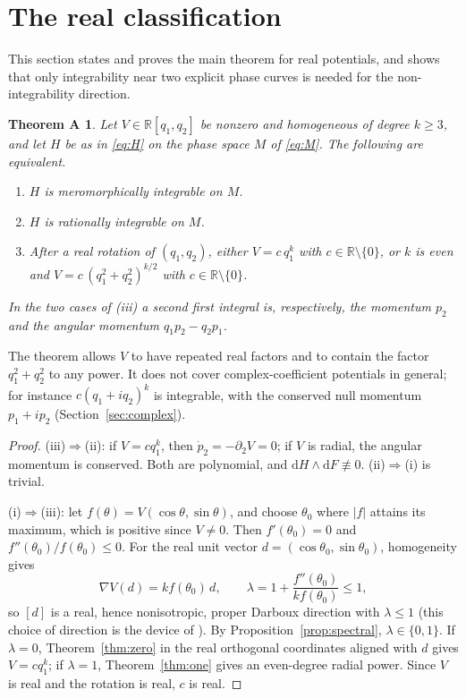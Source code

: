\documentclass[11pt]{article}
\numberwithin{equation}{section}
\newtheorem*{theoremA}{Theorem A}
\theoremstyle{definition}
\theoremstyle{remark}
\newcommand{\R}{\mathbb R}
\newcommand{\dd}{\mathrm d}
\begin{document}
\section{The real classification}\label{sec:proofA}

This section states and proves the main theorem for real potentials, and shows that only integrability near two
explicit phase curves is needed for the non-integrability direction.

\begin{theoremA}
Let $V\in\R[q_1,q_2]$ be nonzero and homogeneous of degree $k\ge3$, and let $H$ be as in \eqref{eq:H} on the
phase space $M$ of \eqref{eq:M}. The following are equivalent.
\begin{enumerate}[label=(\roman*)]
\item $H$ is meromorphically integrable on $M$.
\item $H$ is rationally integrable on $M$.
\item After a real rotation of $(q_1,q_2)$, either $V=c\,q_1^k$ with $c\in\R\setminus\{0\}$, or $k$ is even and
$V=c\,(q_1^2+q_2^2)^{k/2}$ with $c\in\R\setminus\{0\}$.
\end{enumerate}
In the two cases of (iii) a second first integral is, respectively, the momentum $p_2$ and the angular momentum
$q_1p_2-q_2p_1$.
\end{theoremA}

The theorem allows $V$ to have repeated real factors and to contain the factor $q_1^2+q_2^2$ to any power. It does
not cover complex-coefficient potentials in general; for instance $c(q_1+iq_2)^k$ is integrable, with the conserved
null momentum $p_1+ip_2$ (Section~\ref{sec:complex}).

\begin{proof}
(iii)$\Rightarrow$(ii): if $V=cq_1^k$, then $\dot p_2=-\partial_2V=0$; if $V$ is radial, the angular momentum is
conserved. Both are polynomial, and $\dd H\wedge\dd F\not\equiv0$. (ii)$\Rightarrow$(i) is trivial.

(i)$\Rightarrow$(iii): let $f(\theta)=V(\cos\theta,\sin\theta)$, and choose $\theta_0$ where $|f|$ attains its
maximum, which is positive since $V\ne0$. Then $f'(\theta_0)=0$ and $f''(\theta_0)/f(\theta_0)\le0$. For the real unit
vector $d=(\cos\theta_0,\sin\theta_0)$, homogeneity gives
\begin{equation}\label{eq:C1}
\nabla V(d)=k f(\theta_0)\,d,\qquad \lambda=1+\frac{f''(\theta_0)}{kf(\theta_0)}\le1 ,
\end{equation}
so $[d]$ is a real, hence nonisotropic, proper Darboux direction with $\lambda\le1$ (this choice of direction is the
device of \cite[Lemma~3.1]{Combot16}). By Proposition~\ref{prop:spectral}, $\lambda\in\{0,1\}$. If $\lambda=0$,
Theorem~\ref{thm:zero} in the real orthogonal coordinates aligned with $d$ gives $V=cq_1^k$; if $\lambda=1$,
Theorem~\ref{thm:one} gives an even-degree radial power. Since $V$ is real and the rotation is real, $c$ is real.
\end{proof}
\end{document}
